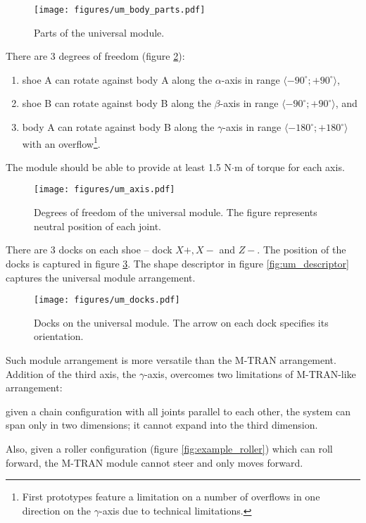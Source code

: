 \begin{figure}[t]
    \centering
    \texttt{[image: figures/um\_body\_parts.pdf]}
    \caption{Parts of the universal module.}
    \label{fig:um_body_parts}
\end{figure}

There are 3 degrees of freedom (figure \ref{fig:um_axis}):
\begin{enumerate}
    \item shoe A can rotate against body A along the $\alpha$-axis in range
    $\langle -90^\circ; +90^\circ\rangle$,
    \item shoe B can rotate against body B along the $\beta$-axis in range
    $\langle -90^\circ; +90^\circ\rangle$, and
    \item body A can rotate against body B along the $\gamma$-axis in range
    $\langle -180^\circ; +180^\circ\rangle$ with an overflow\footnote{First
    prototypes feature a limitation on a number of overflows in one direction on
    the $\gamma$-axis due to technical limitations. }.
\end{enumerate}
The module should be able to provide at least 1.5 N$\cdot$m of
torque for each axis.

\begin{figure}[!t]
    \centering
    \texttt{[image: figures/um\_axis.pdf]}
    \caption{Degrees of freedom of the universal module. The figure represents
    neutral position of each joint.}
    \label{fig:um_axis}
\end{figure}

There are 3 docks on each shoe -- dock $X+, X-$ and $Z-$. The position of the
docks is captured in figure \ref{fig:um_docks}. The shape descriptor in figure
\ref{fig:um_descriptor} captures the universal module arrangement.

\begin{figure}[!t]
    \centering
    \texttt{[image: figures/um\_docks.pdf]}
    \caption{Docks on the universal module. The arrow on each dock specifies its orientation.}
    \label{fig:um_docks}
\end{figure}

Such module arrangement is more versatile than the M-TRAN arrangement. Addition
of the third axis, the $\gamma$-axis, overcomes two limitations of M-TRAN-like
arrangement:
\begin{enumerate*}
    \item given a chain configuration with all joints parallel to each other,
    the system can span only in two dimensions; it cannot expand into the third
    dimension.
    \item Also, given a roller configuration (figure \ref{fig:example_roller})
    which can roll forward, the M-TRAN module cannot steer and only moves
    forward.
\end{enumerate*}

